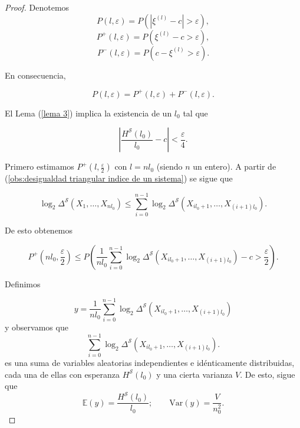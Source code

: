 \documentclass{report}
\begin{document}
\begin{proof}
    Denotemos 
    \[ P(l, \varepsilon) = P(|\xi^{(l)} - c| > \varepsilon) , \] 
    \[ P^+(l, \varepsilon) = P(\xi^{(l)} - c > \varepsilon) , \] 
    \[ P^-(l, \varepsilon) = P(c - \xi^{(l)} > \varepsilon) . \]

    En consecuencia,
    
    \[
    P(l, \varepsilon) = P^+(l, \varepsilon) + P^-(l, \varepsilon).
    \]
    
    El Lema (\ref{lema 3}) implica la existencia de un \( l_0 \) tal que
    
    \begin{equation}\label{desigualdad 14}
    \left| \frac{H^{\mathcal{S}}(l_0)}{l_0} - c \right| < \frac{\varepsilon}{4}.
    \end{equation}
    
    Primero estimamos \( P^+(l, \frac{\varepsilon}{2}) \) con \( l = nl_0 \) (siendo \( n \) un entero).
    A partir de (\ref{obs:desigualdad triangular indice de un sistema}) se sigue que
    
    \[
    \log_2 \Delta^{\mathcal{S}}(X_1, \dots, X_{nl_0}) \leq \sum_{i=0}^{n-1} \log_2 \Delta^{\mathcal{S}}(X_{il_0+1}, \dots, X_{(i+1)l_0}).
    \]
    
    De esto obtenemos
    
    \begin{equation}\label{desigualdad 15}
    P^+\left(nl_0, \frac{\varepsilon}{2}\right) \leq P \left( \frac{1}{nl_0} \sum_{i=0}^{n-1} \log_2 \Delta^{\mathcal{S}}(X_{il_0+1}, \dots, X_{(i+1)l_0}) - c > \frac{\varepsilon}{2} \right).
    \end{equation}
    
    Definimos
    
    \[
    y = \frac{1}{nl_0} \sum_{i=0}^{n-1} \log_2 \Delta^{\mathcal{S}}(X_{il_0+1}, \dots, X_{(i+1)l_0})
    \]
    y observamos que
    \[
    \sum_{i=0}^{n-1} \log_2 \Delta^{\mathcal{S}}(X_{il_0+1}, \dots, X_{(i+1)l_0}).
    \]
    es una suma de variables aleatorias independientes e idénticamente distribuidas, cada una de ellas con esperanza \( H^{\mathcal{S}}(l_0) \)
    y una cierta varianza $V$. De esto, sigue que
    \[
    \mathbb{E}(y) = \frac{H^{\mathcal{S}}(l_0)}{l_0} ; \qquad \text{Var}(y) = \frac{V}{n_0^2}.
    \]\newline


\end{proof}
\end{document}
